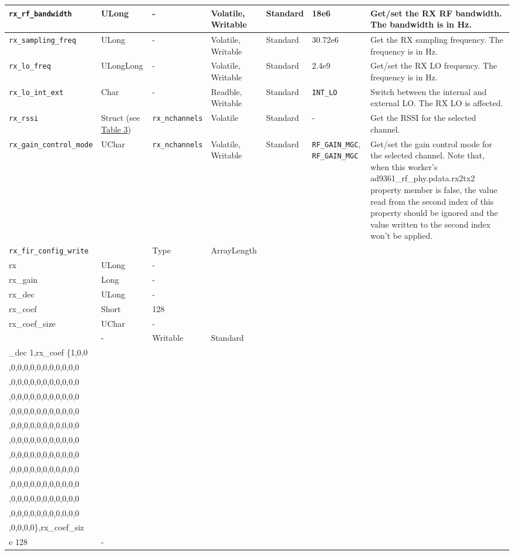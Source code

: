 \documentclass{article}
\begin{document}
\begin{landscape}
\begin{scriptsize}
\begin{longtable}{|p{3.6cm}|p{8.1cm}|p{1.4cm}|p{1.3cm}|p{1.4cm}|p{2.5cm}|p{3.6cm}|}
			\hline
			\verb+rx_rf_bandwidth+ & ULong & - & Volatile, Writable & Standard & 18e6 & Get/set the RX RF bandwidth. The bandwidth is in Hz.\\
			\hline
			\verb+rx_sampling_freq+ & ULong & - & Volatile, Writable & Standard & 30.72e6 & Get the RX sampling frequency. The frequency is in Hz. \\
			\hline
			\verb+rx_lo_freq+ & ULongLong & - & Volatile, Writable & Standard & 2.4e9 & Get/set the RX LO frequency. The frequency is in Hz. \\
			\hline
			\verb+rx_lo_int_ext+ & Char & - & Readble, Writable & Standard & \verb+INT_LO+ & Switch between the internal and external LO. The RX LO is affected. \\
			\hline
			\verb+rx_rssi+ & Struct (see \hyperlink{tab3}{Table 3}) & \verb+rx_nchannels+ & Volatile & Standard & - & Get the RSSI for the selected channel. \\
			\hline
			\verb+rx_gain_control_mode+ & UChar & \verb+rx_nchannels+ & Volatile, Writable & Standard & \verb+RF_GAIN_MGC+, \verb+RF_GAIN_MGC+ & Get/set the gain control mode for the selected channel. Note that, when this worker's ad9361\_rf\_phy.pdata.rx2tx2 property member is false, the value read from the second index of this property should be ignored and the value written to the second index won't be applied. \\
			\hline
			\verb+rx_fir_config_write+ & \begin{tabular}{|p{2.2cm}|p{2.7cm}|p{2cm}|} \hline \cellcolor{blue} Name & \cellcolor{blue}Type & \cellcolor{blue} ArrayLength \\ \hline rx & ULong & - \\ \hline rx\_gain & Long & - \\ \hline rx\_dec & ULong & - \\ \hline rx\_coef & Short & 128 \\ \hline rx\_coef\_size & UChar & - \\ \hline\end{tabular} & - & Writable & Standard & \begin{tabular}{l}rx 0x83,rx\_gain 0,rx\\\_dec 1,rx\_coef \{1,0,0\\,0,0,0,0,0,0,0,0,0,0,0\\,0,0,0,0,0,0,0,0,0,0,0\\,0,0,0,0,0,0,0,0,0,0,0\\,0,0,0,0,0,0,0,0,0,0,0\\,0,0,0,0,0,0,0,0,0,0,0\\,0,0,0,0,0,0,0,0,0,0,0\\,0,0,0,0,0,0,0,0,0,0,0\\,0,0,0,0,0,0,0,0,0,0,0\\,0,0,0,0,0,0,0,0,0,0,0\\,0,0,0,0,0,0,0,0,0,0,0\\,0,0,0,0,0,0,0,0,0,0,0\\,0,0,0,0\},rx\_coef\_siz\\e 128\end{tabular} & - \\

\end{longtable}
\end{scriptsize}
\end{landscape}
\end{document}
